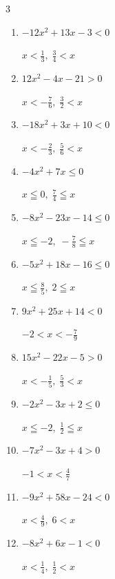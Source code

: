 \begin{multicols}{3}
\begin{enumerate}
  \item $-12x^{2}+13x-3<0$

        $\displaystyle x < \frac{1}{3} , \; \frac{3}{4} < x$

\columnbreak %

  \item $12x^{2}-4x-21>0$

        $\displaystyle x < -\frac{7}{6} , \; \frac{3}{2} < x$

  \item $-18x^{2}+3x+10<0$

        $\displaystyle x < -\frac{2}{3} , \; \frac{5}{6} < x$

  \item $-4x^{2}+7x\leq 0$

        $\displaystyle x \leqq 0 , \; \frac{7}{4} \leqq x$

  \item $-8x^{2}-23x-14\leq 0$

        $\displaystyle x \leqq -2 , \; -\frac{7}{8} \leqq x$

  \item $-5x^{2}+18x-16\leq 0$

        $\displaystyle x \leqq \frac{8}{5} , \; 2 \leqq x$

  \item $9x^{2}+25x+14<0$

        $\displaystyle -2 < x < -\frac{7}{9}$

  \item $15x^{2}-22x-5>0$

        $\displaystyle x < -\frac{1}{5} , \; \frac{5}{3} < x$

  \item $-2x^{2}-3x+2\leq 0$

        $\displaystyle x \leqq -2 , \; \frac{1}{2} \leqq x$

  \item $-7x^{2}-3x+4>0$

        $\displaystyle -1 < x < \frac{4}{7}$

  \item $-9x^{2}+58x-24<0$

        $\displaystyle x < \frac{4}{9} , \; 6 < x$

\columnbreak %

\resetques

  \item $-8x^{2}+6x-1<0$

        $\displaystyle x < \frac{1}{4} , \; \frac{1}{2} < x$


\end{enumerate}
\end{multicols}
